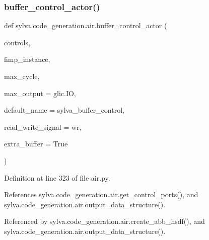 \mbox{\label{namespacesylva_1_1code__generation_1_1air_a1a46162a8988513e15b0b45a4b456340}} 
\subsubsection{\texorpdfstring{buffer\+\_\+control\+\_\+actor()}{buffer\_control\_actor()}}
{\footnotesize\ttfamily def sylva.\+code\+\_\+generation.\+air.\+buffer\+\_\+control\+\_\+actor (\begin{DoxyParamCaption}\item[{}]{controls,  }\item[{}]{fimp\+\_\+instance,  }\item[{}]{max\+\_\+cycle,  }\item[{}]{max\+\_\+output = {\ttfamily glic.IO},  }\item[{}]{default\+\_\+name = {\ttfamily \textquotesingle{}sylva\+\_\+buffer\+\_\+control\textquotesingle{}},  }\item[{}]{read\+\_\+write\+\_\+signal = {\ttfamily \textquotesingle{}wr\textquotesingle{}},  }\item[{}]{extra\+\_\+buffer = {\ttfamily True} }\end{DoxyParamCaption})}



Definition at line 323 of file air.\+py.



References sylva.\+code\+\_\+generation.\+air.\+get\+\_\+control\+\_\+ports(), and sylva.\+code\+\_\+generation.\+air.\+output\+\_\+data\+\_\+structure().



Referenced by sylva.\+code\+\_\+generation.\+air.\+create\+\_\+abb\+\_\+hsdf(), and sylva.\+code\+\_\+generation.\+air.\+output\+\_\+data\+\_\+structure().


